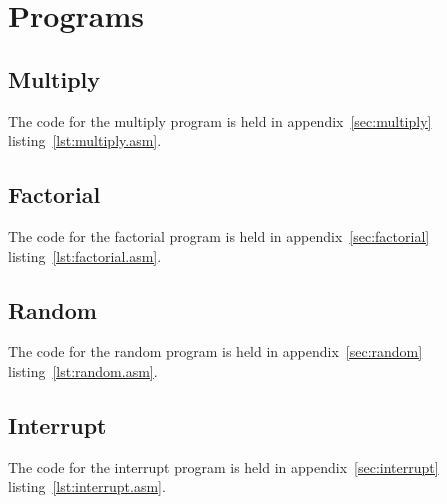 \section{Programs}
\subsection{Multiply}
The code for the multiply program is held in appendix~\ref{sec:multiply} listing~\ref{lst:multiply.asm}.

\subsection{Factorial}
The code for the factorial program is held in appendix~\ref{sec:factorial} listing~\ref{lst:factorial.asm}.

\subsection{Random}
The code for the random program is held in appendix~\ref{sec:random} listing~\ref{lst:random.asm}.

\subsection{Interrupt}
The code for the interrupt program is held in appendix~\ref{sec:interrupt} listing~\ref{lst:interrupt.asm}.

